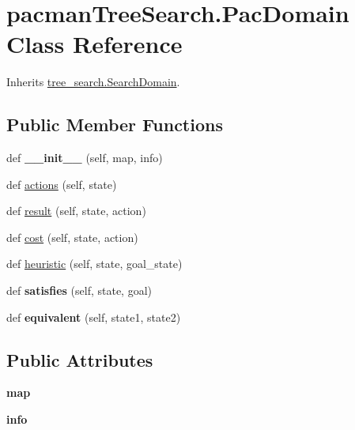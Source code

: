 \hypertarget{classpacman_tree_search_1_1_pac_domain}{}\section{pacman\+Tree\+Search.\+Pac\+Domain Class Reference}
\label{classpacman_tree_search_1_1_pac_domain}


Inherits \hyperlink{classtree__search_1_1_search_domain}{tree\+\_\+search.\+Search\+Domain}.

\subsection*{Public Member Functions}
\begin{DoxyCompactItemize}
\item 
\mbox{\label{classpacman_tree_search_1_1_pac_domain_a624fd17966a0d8fc045f879a756d4984}} 
def {\bfseries \+\_\+\+\_\+init\+\_\+\+\_\+} (self, map, info)
\item 
def \hyperlink{classpacman_tree_search_1_1_pac_domain_a95a706f2147863ec5df3b79ea7af5b8f}{actions} (self, state)
\item 
def \hyperlink{classpacman_tree_search_1_1_pac_domain_a168ff25a4290929fd7c8a996bdf6fd9f}{result} (self, state, action)
\item 
def \hyperlink{classpacman_tree_search_1_1_pac_domain_adec7eec583e7446c00530ebcfda9a320}{cost} (self, state, action)
\item 
def \hyperlink{classpacman_tree_search_1_1_pac_domain_aa4a5017a21583f8fda719af130179c47}{heuristic} (self, state, goal\+\_\+state)
\item 
\mbox{\label{classpacman_tree_search_1_1_pac_domain_a5635dd21f165367195b2d1473168476a}} 
def {\bfseries satisfies} (self, state, goal)
\item 
\mbox{\label{classpacman_tree_search_1_1_pac_domain_aec32a3c18e4b535fc0eeb130a12fffba}} 
def {\bfseries equivalent} (self, state1, state2)
\end{DoxyCompactItemize}
\subsection*{Public Attributes}
\begin{DoxyCompactItemize}
\item 
\mbox{\label{classpacman_tree_search_1_1_pac_domain_ae8c01f57ed55f1d1e947309d04cd6323}} 
{\bfseries map}
\item 
\mbox{\label{classpacman_tree_search_1_1_pac_domain_ac6958cb13156d6ab106143b723f55631}} 
{\bfseries info}
\end{DoxyCompactItemize}


